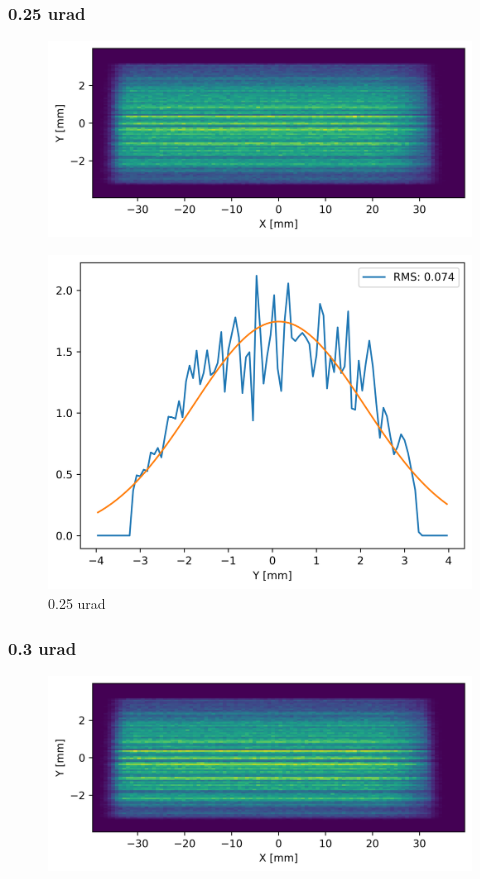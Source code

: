 \subsubsection{0.25 urad}
\begin{figure}[H]
\centering
\includegraphics[width=0.9\linewidth]{./../figures/slope_error/WB4C_d30_d-spacing_gradient_45keV_slope_error025urad.png}
\end{figure}

\begin{figure}[H]
\centering
\includegraphics[width=0.9\linewidth]{./../figures/slope_error/WB4C_d30_d-spacing_gradient_45keV_slope_error025urad_Yprofile.png}
\caption{0.25 urad}
\label{fig:025urad}
\end{figure}

\clearpage
\subsubsection{0.3 urad}
\begin{figure}[H]
\centering
\includegraphics[width=0.9\linewidth]{./../figures/slope_error/WB4C_d30_d-spacing_gradient_45keV_slope_error03urad.png}
\end{figure}

